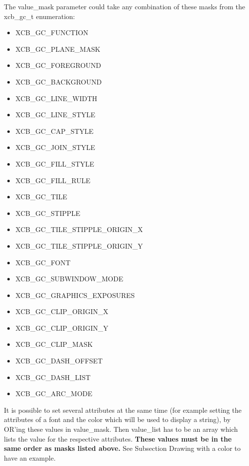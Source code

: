 \documentclass[12pt,oneside,titlepage]{book}
\providecommand{\tightlist}{%
  \setlength{\itemsep}{0pt}\setlength{\parskip}{0pt}}
\begin{document}
\begin{enumerate}
\begin{enumerate}
    The {value\_mask} parameter could take any combination of these
    masks from the xcb\_gc\_t enumeration:

    \begin{itemize}
    \tightlist
    \item
      XCB\_GC\_FUNCTION
    \item
      XCB\_GC\_PLANE\_MASK
    \item
      XCB\_GC\_FOREGROUND
    \item
      XCB\_GC\_BACKGROUND
    \item
      XCB\_GC\_LINE\_WIDTH
    \item
      XCB\_GC\_LINE\_STYLE
    \item
      XCB\_GC\_CAP\_STYLE
    \item
      XCB\_GC\_JOIN\_STYLE
    \item
      XCB\_GC\_FILL\_STYLE
    \item
      XCB\_GC\_FILL\_RULE
    \item
      XCB\_GC\_TILE
    \item
      XCB\_GC\_STIPPLE
    \item
      XCB\_GC\_TILE\_STIPPLE\_ORIGIN\_X
    \item
      XCB\_GC\_TILE\_STIPPLE\_ORIGIN\_Y
    \item
      XCB\_GC\_FONT
    \item
      XCB\_GC\_SUBWINDOW\_MODE
    \item
      XCB\_GC\_GRAPHICS\_EXPOSURES
    \item
      XCB\_GC\_CLIP\_ORIGIN\_X
    \item
      XCB\_GC\_CLIP\_ORIGIN\_Y
    \item
      XCB\_GC\_CLIP\_MASK
    \item
      XCB\_GC\_DASH\_OFFSET
    \item
      XCB\_GC\_DASH\_LIST
    \item
      XCB\_GC\_ARC\_MODE
    \end{itemize}

    It is possible to set several attributes at the same time (for
    example setting the attributes of a font and the color which will be
    used to display a string), by OR'ing these values in {value\_mask}.
    Then {value\_list} has to be an array which lists the value for the
    respective attributes. \textbf{These values must be in the same
    order as masks listed above.} See Subsection Drawing with a color to
    have an example.


\end{enumerate}
\end{enumerate}
\end{document}
